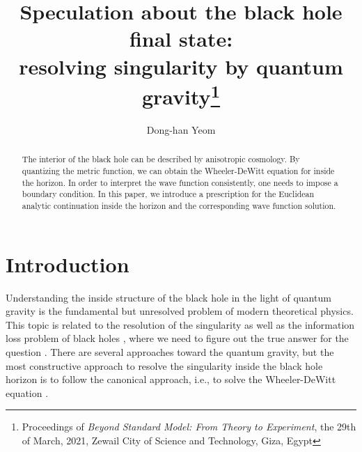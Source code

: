 \documentclass{andromedaone}
\begin{document}
\title{Speculation about the black hole final state:\\ resolving singularity by quantum gravity\footnote{Proceedings of \textit{Beyond Standard Model: From Theory to Experiment}, the 29th of March, 2021, Zewail City of Science and Technology, Giza, Egypt}}

\author{Dong-han Yeom}
\address{$^1$Department of Physics Education, Pusan National University, Busan 46241, Republic of Korea}
\address{$^2$Research Center for Dielectric and Advanced Matter Physics, Pusan National University, Busan 46241, Republic of Korea}

\begin{abstract}
The interior of the black hole can be described by anisotropic cosmology. By quantizing the metric function, we can obtain the Wheeler-DeWitt equation for inside the horizon. In order to interpret the wave function consistently, one needs to impose a boundary condition. In this paper, we introduce a prescription for the Euclidean analytic continuation inside the horizon and the corresponding wave function solution.
\end{abstract}


\maketitle



\section{Introduction}

Understanding the inside structure of the black hole in the light of quantum gravity is the fundamental but unresolved problem of modern theoretical physics. This topic is related to the resolution of the singularity \cite{Bojowald:2018xxu} as well as the information loss problem of black holes \cite{Hawking:1976ra}, where we need to figure out the true answer for the question \cite{Yeom:2008qw}. There are several approaches toward the quantum gravity, but the most constructive approach to resolve the singularity inside the black hole horizon is to follow the canonical approach, i.e., to solve the Wheeler-DeWitt equation \cite{DeWitt:1967yk}.
\end{document}
